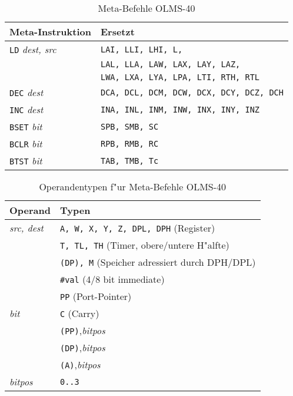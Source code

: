 \documentclass[12pt,a4paper,twoside]{report}
\newcommand{\tty}[1]{{\tt #1}}
\begin{document}
{\begin{table*}
\begin{center}\begin{tabular}{|l|l|}
\hline
Meta-Instruktion          & Ersetzt \\
\hline
\tty{LD} {\em dest, src}        & \tty{LAI, LLI, LHI, L,} \\
                                & \tty{LAL, LLA, LAW, LAX, LAY, LAZ,} \\
                                & \tty{LWA, LXA, LYA, LPA, LTI, RTH, RTL} \\
\tty{DEC} {\em dest}            & \tty{DCA, DCL, DCM, DCW, DCX, DCY, DCZ, DCH} \\
\tty{INC} {\em dest}            & \tty{INA, INL, INM, INW, INX, INY, INZ} \\
\tty{BSET} {\em bit}            & \tty{SPB, SMB, SC} \\
\tty{BCLR} {\em bit}            & \tty{RPB, RMB, RC} \\
\tty{BTST} {\em bit}            & \tty{TAB, TMB, Tc} \\
\hline
\end{tabular}\end{center}
\caption{Meta-Befehle OLMS-40}
\label{TabOLMS40Meta}
\end{table*}

\begin{table*}
\begin{center}\begin{tabular}{|l|l|}
\hline
Operand                 & Typen \\
\hline
{\em src, dest}         & \tty{A, W, X, Y, Z, DPL, DPH} (Register) \\
                        & \tty{T, TL, TH} (Timer, obere/untere H"alfte) \\
                        & \tty{(DP), M} (Speicher adressiert durch DPH/DPL) \\
                        & \tty{\#val} (4/8 bit immediate) \\
                        & \tty{PP} (Port-Pointer) \\
{\em bit}               & \tty{C} (Carry) \\
                        & \tty{(PP)},{\em bitpos} \\
                        & \tty{(DP)},{\em bitpos} \\
                        & \tty{(A)},{\em bitpos} \\
{\em bitpos}            & \tty{0..3} \\
\hline
\end{tabular}\end{center}
\caption{Operandentypen f"ur Meta-Befehle OLMS-40}
\label{TabOLMS40MetaOps}
\end{table*}

}
\end{document}
